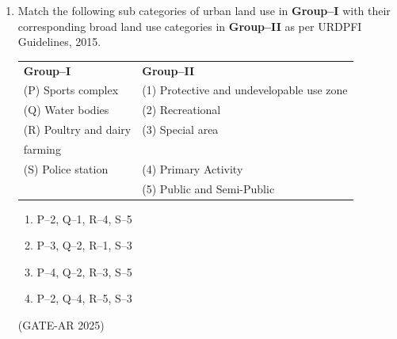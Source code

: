 \documentclass[a4paper,10pt]{article}
\begin{document}
\begin{enumerate}
\item Match the following sub categories of urban land use in \textbf{Group–I} with their corresponding broad land use categories in \textbf{Group–II} as per URDPFI Guidelines, 2015. \\
\begin{tabular}{ l l }
\textbf{Group–I} & \textbf{Group–II} \\
(P) Sports complex & (1) Protective and undevelopable use zone \\
(Q) Water bodies & (2) Recreational \\
(R) Poultry and dairy & (3) Special area \\
farming & \\
(S) Police station & (4) Primary Activity \\
& (5) Public and Semi-Public \\
\end{tabular}
\begin{multicols}{2}
\begin{enumerate}
    \item P–2, Q–1, R–4, S–5
    \item P–3, Q–2, R–1, S–3
    \item P–4, Q–2, R–3, S–5
    \item P–2, Q–4, R–5, S–3
\end{enumerate}
\end{multicols}
\hfill (GATE-AR 2025)


\end{enumerate}
\end{document}
